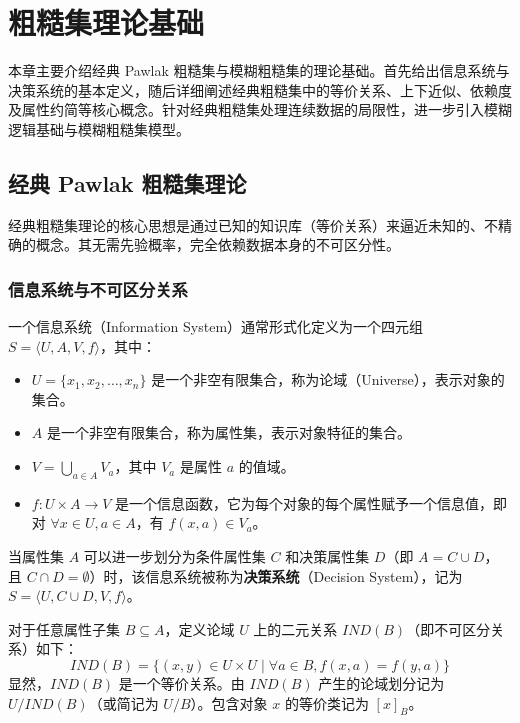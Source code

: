 
\chapter{粗糙集理论基础}

本章主要介绍经典 Pawlak 粗糙集与模糊粗糙集的理论基础。首先给出信息系统与决策系统的基本定义，随后详细阐述经典粗糙集中的等价关系、上下近似、依赖度及属性约简等核心概念。针对经典粗糙集处理连续数据的局限性，进一步引入模糊逻辑基础与模糊粗糙集模型。

\section{经典 Pawlak 粗糙集理论}

经典粗糙集理论的核心思想是通过已知的知识库（等价关系）来逼近未知的、不精确的概念。其无需先验概率，完全依赖数据本身的不可区分性。

\subsection{信息系统与不可区分关系}

\begin{definition}[信息系统]
	一个信息系统（Information System）通常形式化定义为一个四元组 \(S = \langle U, A, V, f \rangle\)，其中：
	\begin{itemize}
		\item \(U = \{x_1, x_2, \dots, x_n\}\) 是一个非空有限集合，称为论域（Universe），表示对象的集合。
		\item \(A\) 是一个非空有限集合，称为属性集，表示对象特征的集合。
		\item \(V = \bigcup_{a \in A} V_a\)，其中 \(V_a\) 是属性 \(a\) 的值域。
		\item \(f: U \times A \to V\) 是一个信息函数，它为每个对象的每个属性赋予一个信息值，即对 \(\forall x \in U, a \in A\)，有 \(f(x, a) \in V_a\)。
	\end{itemize}
\end{definition}

当属性集 \(A\) 可以进一步划分为条件属性集 \(C\) 和决策属性集 \(D\)（即 \(A = C \cup D\)，且 \(C \cap D = \emptyset\)）时，该信息系统被称为\textbf{决策系统}（Decision System），记为 \(S = \langle U, C \cup D, V, f \rangle\)。

\begin{definition}[不可区分关系与等价类]
	对于任意属性子集 \(B \subseteq A\)，定义论域 \(U\) 上的二元关系 \(IND(B)\)（即不可区分关系）如下：
	\begin{equation}
		IND(B) = \{ (x, y) \in U \times U \mid \forall a \in B, f(x, a) = f(y, a) \}
	\end{equation}
	显然，\(IND(B)\) 是一个等价关系。由 \(IND(B)\) 产生的论域划分记为 \(U/IND(B)\)（或简记为 \(U/B\)）。包含对象 \(x\) 的等价类记为 \([x]_B\)。
\end{definition}

